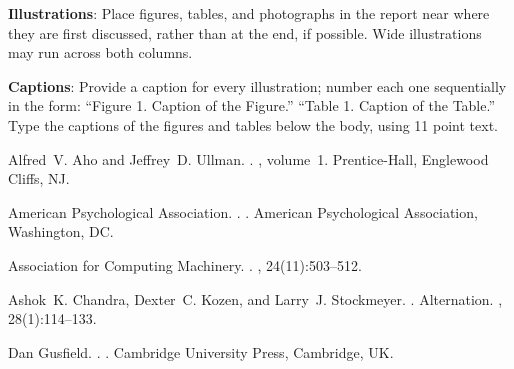 \documentclass[11pt]{article}
\begin{document}
{\bf Illustrations}: Place figures, tables, and photographs in the
report near where they are first discussed, rather than at the end, if
possible.  Wide illustrations may run across both columns.

{\bf Captions}: Provide a caption for every illustration; number each one
sequentially in the form:  ``Figure 1. Caption of the Figure.'' ``Table 1.
Caption of the Table.''  Type the captions of the figures and 
tables below the body, using 11 point text.

\begin{thebibliography}{}

Alfred~V. Aho and Jeffrey~D. Ullman.
.
, volume~1.
\newblock Prentice-{Hall}, Englewood Cliffs, NJ.

{American Psychological Association}.
.
.
\newblock American Psychological Association, Washington, DC.

{Association for Computing Machinery}.
.
, 24(11):503--512.

Ashok~K. Chandra, Dexter~C. Kozen, and Larry~J. Stockmeyer.
.
\newblock Alternation.
,
  28(1):114--133.

Dan Gusfield.
.
.
\newblock Cambridge University Press, Cambridge, UK.

\end{thebibliography}
\end{document}
